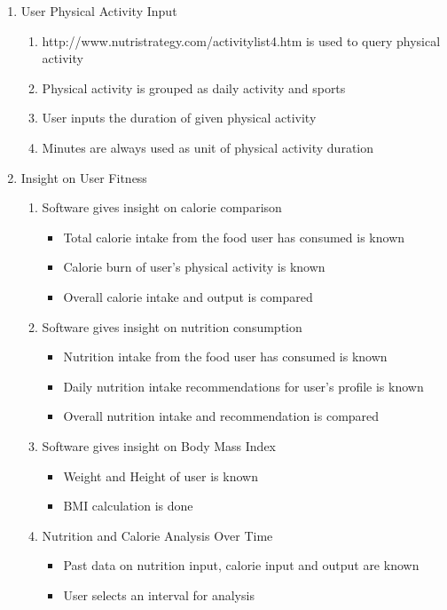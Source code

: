 \begin{enumerate}
\begin{enumerate}
\begin{enumerate}
\begin{enumerate}
			\end{enumerate}
		\item User Physical Activity Input
			\begin{enumerate}
			\item http://www.nutristrategy.com/activitylist4.htm​ is used to query physical activity
			\item Physical activity is grouped as daily activity and sports
			\item User inputs the duration of given physical activity
			\item Minutes are always used as unit of physical activity duration
			\end{enumerate}
		\item Insight on User Fitness
			\begin{enumerate}
			\item Software gives insight on calorie comparison
				\begin{itemize}
				\item Total calorie intake from the food user has consumed is known
				\item Calorie burn of user’s physical activity is known
				\item Overall calorie intake and output is compared
				\end{itemize}
			\item Software gives insight on nutrition consumption
				\begin{itemize}
				\item Nutrition intake from the food user has consumed is known
				\item Daily nutrition intake recommendations for user’s profile is known
				\item Overall nutrition intake and recommendation is compared
				\end{itemize}
			\item Software gives insight on Body Mass Index
				\begin{itemize}
				\item Weight and Height of user is known
				\item BMI calculation is done
				\end{itemize}
		\item Nutrition and Calorie Analysis Over Time
			\begin{itemize}
			\item Past data on nutrition input, calorie input and output are known
			\item User selects an interval for analysis

\end{itemize}
\end{enumerate}
\end{enumerate}
\end{enumerate}
\end{enumerate}

